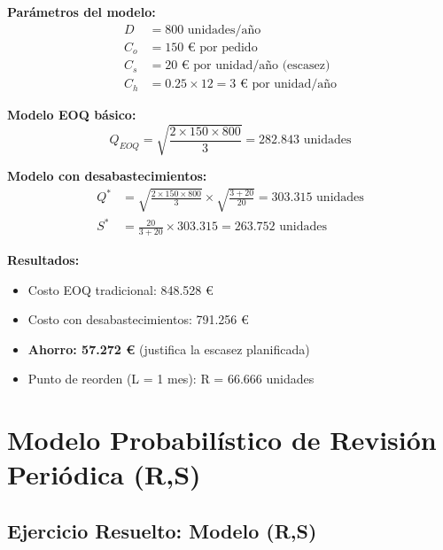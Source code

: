 \documentclass[12pt,a4paper]{book}
\begin{document}
	\begin{tcolorbox}[enhanced,colback=azulclaro,colframe=azulprincipal,boxrule=2pt,arc=8pt,
		title={\bfseries\color{white} \faCalculator\ SOLUCIÓN}]
		
		\textbf{Parámetros del modelo:}
		\begin{align}
			D &= 800 \text{ unidades/año}\\
			C_o &= 150 \text{ € por pedido}\\
			C_s &= 20 \text{ € por unidad/año (escasez)}\\
			C_h &= 0.25 \times 12 = 3 \text{ € por unidad/año}
		\end{align}
		
		\textbf{Modelo EOQ básico:}
		\begin{equation}
			Q_{EOQ} = \sqrt{\frac{2 \times 150 \times 800}{3}} = 282.843 \text{ unidades}
		\end{equation}
		
		\textbf{Modelo con desabastecimientos:}
		\begin{align}
			Q^* &= \sqrt{\frac{2 \times 150 \times 800}{3}} \times \sqrt{\frac{3 + 20}{20}} = 303.315 \text{ unidades}\\
			S^* &= \frac{20}{3 + 20} \times 303.315 = 263.752 \text{ unidades}
		\end{align}
		
		\textbf{Resultados:}
		\begin{itemize}[leftmargin=*,label=\textcolor{verdeprincipal}{\faCheckCircle}]
			\item Costo EOQ tradicional: 848.528 €
			\item Costo con desabastecimientos: 791.256 €
			\item \textbf{Ahorro: 57.272 €} (justifica la escasez planificada)
			\item Punto de reorden (L = 1 mes): R = 66.666 unidades
		\end{itemize}
		
	\end{tcolorbox}
	
	\section{Modelo Probabilístico de Revisión Periódica (R,S)}
	
	\subsection{Ejercicio Resuelto: Modelo (R,S)}
	
\end{document}
